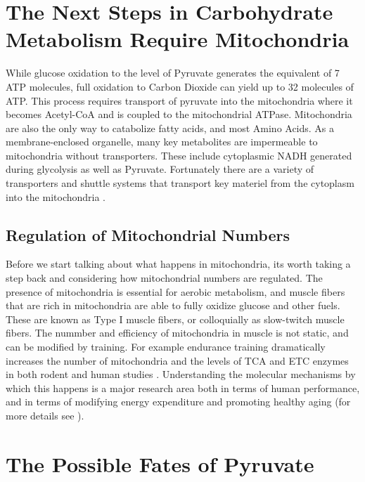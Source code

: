\documentclass{tufte-handout}
\begin{document}
\section{The Next Steps in Carbohydrate Metabolism Require Mitochondria}
While glucose oxidation to the level of Pyruvate generates the equivalent of 7 ATP molecules, full oxidation to Carbon Dioxide can yield up to 32 molecules of ATP.  This process requires transport of pyruvate into the mitochondria where it becomes Acetyl-CoA and is coupled to the mitochondrial ATPase.  Mitochondria are also the only way to catabolize fatty acids, and most Amino Acids.  As a membrane-enclosed organelle, many key metabolites are impermeable to mitochondria without transporters.  These include cytoplasmic NADH generated during glycolysis as well as Pyruvate.  Fortunately there are a variety of transporters and shuttle systems that transport key materiel from the cytoplasm into the mitochondria .

\subsection{Regulation of Mitochondrial Numbers}
Before we start talking about what happens in mitochondria, its worth taking a step back and considering how mitochondrial numbers are regulated.  The presence of mitochondria is essential for aerobic metabolism, and muscle fibers that are rich in mitochondria are able to fully oxidize glucose and other fuels.  These are known as Type I muscle fibers, or colloquially as slow-twitch muscle fibers.  The nummber and efficiency of mitochondria in muscle is not static, and can be modified by training.  For example endurance training dramatically increases the number of mitochondria and the levels of TCA and ETC enzymes in both rodent and human studies \citep{Holloszy1967,Gollnick1972,Gollnick1973}.  Understanding the molecular mechanisms by which this happens is a major research area both in terms of human performance, and in terms of modifying energy expenditure and promoting healthy aging (for more details see \citet{Cartee2016}). 

\section{The Possible Fates of Pyruvate}
\end{document}
